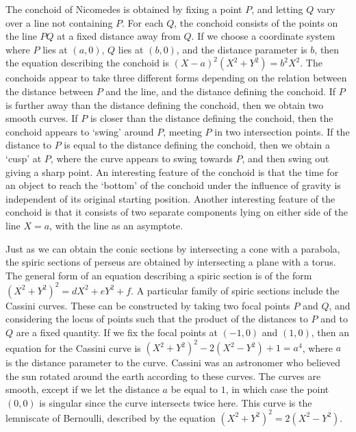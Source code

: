 \begin{example}
    The conchoid of Nicomedes is obtained by fixing a point $P$, and letting $Q$ vary over a line not containing $P$. For each $Q$, the conchoid consists of the points on the line $PQ$ at a fixed distance away from $Q$. If we choose a coordinate system where $P$ lies at $(a,0)$, $Q$ lies at $(b,0)$, and the distance parameter is $b$, then the equation describing the conchoid is $(X - a)^2(X^2 + Y^2) = b^2X^2$. The conchoids appear to take three different forms depending on the relation between the distance between $P$ and the line, and the distance defining the conchoid. If $P$ is further away than the distance defining the conchoid, then we obtain two smooth curves. If $P$ is closer than the distance defining the conchoid, then the conchoid appears to `swing' around $P$, meeting $P$ in two intersection points. If the distance to $P$ is equal to the distance defining the conchoid, then we obtain a `cusp' at $P$, where the curve appears to swing towards $P$, and then swing out giving a sharp point. An interesting feature of the conchoid is that the time for an object to reach the `bottom' of the conchoid under the influence of gravity is independent of its original starting position. Another interesting feature of the conchoid is that it consists of two separate components lying on either side of the line $X = a$, with the line as an asymptote.
\end{example}

\begin{example}
    Just as we can obtain the conic sections by intersecting a cone with a parabola, the spiric sections of perseus are obtained by intersecting a plane with a torus. The general form of an equation describing a spiric section is of the form $(X^2 + Y^2)^2 = dX^2 + eY^2 + f$. A particular family of spiric sections include the Cassini curves. These can be constructed by taking two focal points $P$ and $Q$, and considering the locus of points such that the product of the distances to $P$ and to $Q$ are a fixed quantity. If we fix the focal points at $(-1,0)$ and $(1,0)$, then an equation for the Cassini curve is $(X^2 + Y^2)^2 - 2(X^2 - Y^2) + 1 = a^4$, where $a$ is the distance parameter to the curve. Cassini was an astronomer who believed the sun rotated around the earth according to these curves. The curves are smooth, except if we let the distance $a$ be equal to $1$, in which case the point $(0,0)$ is singular since the curve intersects twice here. This curve is the lemniscate of Bernoulli, described by the equation $(X^2 + Y^2)^2 = 2(X^2 - Y^2)$.
\end{example}

